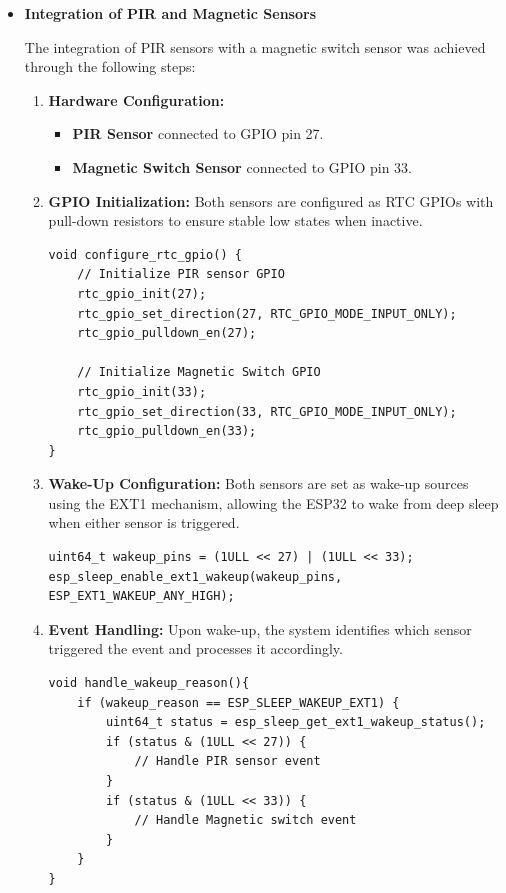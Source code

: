 \documentclass[A4,10pt]{article}
\begin{document}
\begin{itemize}
	\item \textbf{Integration of PIR and Magnetic Sensors}
	
	The integration of PIR sensors with a magnetic switch sensor was achieved through the following steps:

	\begin{enumerate}
		\item \textbf{Hardware Configuration:} 
		\begin{itemize}
			\item \textbf{PIR Sensor} connected to GPIO pin 27.
			\item \textbf{Magnetic Switch Sensor} connected to GPIO pin 33.
		\end{itemize}
		
		\item \textbf{GPIO Initialization:} 
		Both sensors are configured as RTC GPIOs with pull-down resistors to ensure stable low states when inactive.
		
		\begin{verbatim}
void configure_rtc_gpio() {
    // Initialize PIR sensor GPIO
    rtc_gpio_init(27);
    rtc_gpio_set_direction(27, RTC_GPIO_MODE_INPUT_ONLY);
    rtc_gpio_pulldown_en(27);
    
    // Initialize Magnetic Switch GPIO
    rtc_gpio_init(33);
    rtc_gpio_set_direction(33, RTC_GPIO_MODE_INPUT_ONLY);
    rtc_gpio_pulldown_en(33);
}
		\end{verbatim}
		
		\item \textbf{Wake-Up Configuration:} 
		Both sensors are set as wake-up sources using the EXT1 mechanism, allowing the ESP32 to wake from deep sleep when either sensor is triggered.
		\begin{verbatim}
uint64_t wakeup_pins = (1ULL << 27) | (1ULL << 33);
esp_sleep_enable_ext1_wakeup(wakeup_pins, ESP_EXT1_WAKEUP_ANY_HIGH);
		\end{verbatim}
		
		\item \textbf{Event Handling:} 
		Upon wake-up, the system identifies which sensor triggered the event and processes it accordingly.
		\begin{verbatim}
void handle_wakeup_reason(){
    if (wakeup_reason == ESP_SLEEP_WAKEUP_EXT1) {
        uint64_t status = esp_sleep_get_ext1_wakeup_status();
        if (status & (1ULL << 27)) {
            // Handle PIR sensor event
        }
        if (status & (1ULL << 33)) {
            // Handle Magnetic switch event
        }
    }
}
		\end{verbatim}
			\end{enumerate}
\end{itemize}
\end{document}
